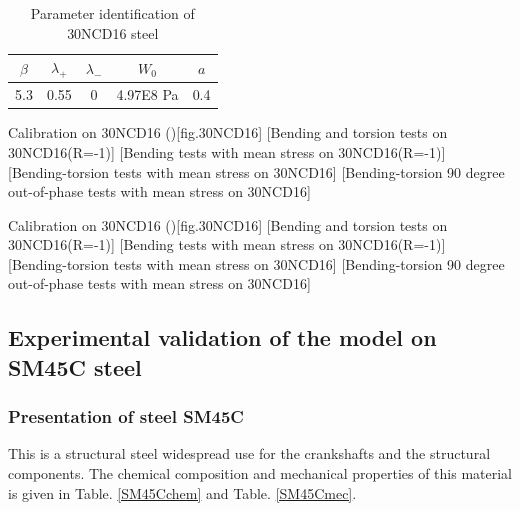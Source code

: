 \documentclass[3p,times,number,review]{elsarticle}
\begin{document}
\begin{table}[!h]
\centering
\begin{tabular}{|c|c|c|c|c|}
	\hline
	\textbf{$\beta$} & \textbf{$\lambda_+$} & \textbf{$\lambda_-$} & \textbf{$W_0$} & \textbf{$a$}  \\ \hline
	5.3     & 0.55 &0         &4.97E8 Pa  & 0.4    \\ \hline
\end{tabular}
\caption{Parameter identification of 30NCD16 steel}
\label{30ncdpara2}
\end{table}

\begin{Figure}[!h]{Calibration on  30NCD16 (\cite{Dubar1992})}[fig.30NCD16]
	[Bending and torsion tests on 30NCD16(R=-1)]
	[Bending tests with mean stress on 30NCD16(R=-1)]
	\\
	[Bending-torsion tests with mean stress on 30NCD16]
	[Bending-torsion 90 degree out-of-phase tests with mean stress on 30NCD16]
\end{Figure}

\begin{Figure}[!h]{Calibration on  30NCD16 (\cite{Dubar1992})}[fig.30NCD16]
[Bending and torsion tests on 30NCD16(R=-1)]
[Bending tests with mean stress on 30NCD16(R=-1)]
\\
[Bending-torsion tests with mean stress on 30NCD16]
[Bending-torsion 90 degree out-of-phase tests with mean stress on 30NCD16]
\end{Figure}


\clearpage
\subsection{Experimental validation of the model on SM45C steel}
\subsubsection{Presentation of steel SM45C}
This is a structural steel widespread use for the crankshafts and the structural components. The chemical composition and mechanical properties of this material is given in Table. \ref{SM45Cchem} and Table. \ref{SM45Cmec}.
\end{document}
